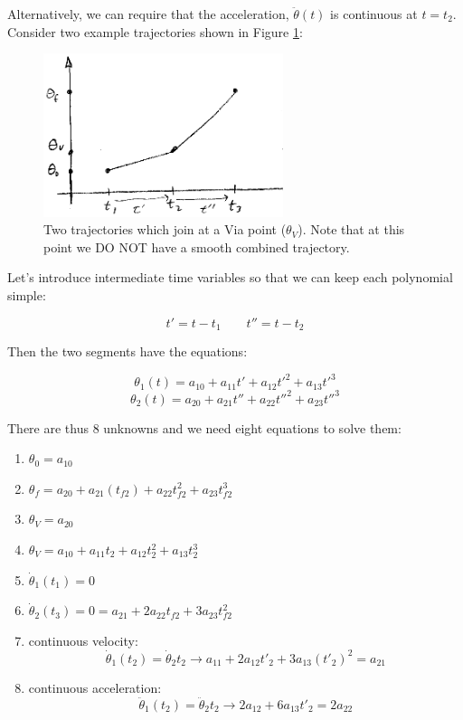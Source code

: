 Alternatively, we can require that the acceleration, $\ddot{\theta}(t)$ is continuous at $t=t_2$.
Consider two example trajectories shown in Figure \ref{twotrajectories}:

\begin{figure}\centering
\includegraphics[width= 7.0cm]{figs07/00515.eps}
\caption{Two trajectories which join at a Via point ($\theta_V$).  Note that at this point we DO NOT have a smooth combined trajectory.}\label{twotrajectories}
\end{figure}



Let's introduce intermediate time variables so that we can keep each polynomial simple:

\[
t' = t - t_1       \qquad      t'' = t - t_2
\]

Then the two segments have the equations:

\[
\theta_1(t) = a_{10} + a_{11}t' + a_{12}t'^2 + a_{13}t'^3
\]
\[
\theta_2(t) = a_{20} + a_{21}t'' + a_{22}t''^2 + a_{23}t''^3
\]

There are thus 8 unknowns and we need eight equations to solve them:

\begin{enumerate}
  \item $\theta_0 = a_{10}$
  \item $\theta_f = a_{20} + a_{21}(t_{f2})+ a_{22}t_{f2}^2+a_{23}t_{f2}^3$
  \item $\theta_V = a_{20}$
  \item $\theta_V = a_{10}+a_{11}t_2 + a_{12}t_2^2+a_{13}t_2^3$
  \item $\dot{\theta}_1(t_1) = 0$
  \item $\dot{\theta}_2(t_3) = 0 = a_{21}+2a_{22}t_{f2}+3a_{23}t_{f2}^2$
  \item continuous velocity:
  \[
  \dot{\theta}_1(t_2) = \dot{\theta}_2{t_2} \to a_{11} + 2a_{12}t'_2+3a_{13}(t'_2)^2 = a_{21}
  \]
  \item continuous acceleration:
  \[
   \ddot{\theta}_1(t_2) = \ddot{\theta}_2{t_2} \to 2a_{12} + 6a_{13}t'_2 = 2 a_{22}
  \]
\end{enumerate}

